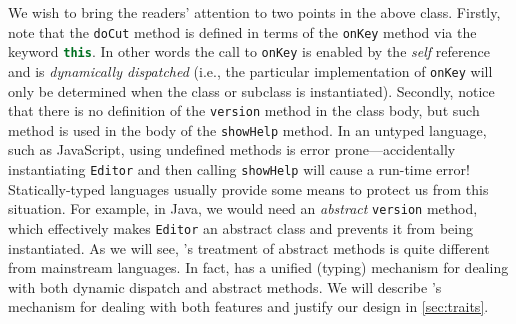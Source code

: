 We wish to bring the readers' attention to two points in the above class.
Firstly, note that the \lstinline{doCut} method is defined in terms of the
\lstinline{onKey} method via the keyword
\lstinline[language=JavaScript]{this}. In other words the call to
\lstinline{onKey} is enabled by the \emph{self} reference and is
\emph{dynamically dispatched} (i.e., the particular implementation of
\lstinline{onKey} will only be determined when the class or subclass
is instantiated). %
Secondly, notice that there is no definition of
the \lstinline{version} method in the class body, but such method is used in the body of the
\lstinline{showHelp} method. In an untyped language, such as JavaScript, using
undefined methods is error prone---accidentally instantiating \lstinline{Editor}
and then calling \lstinline{showHelp} will cause a run-time error!
Statically-typed languages usually provide some means to protect us from this
situation. For example, in Java, we would need an \textit{abstract} \lstinline{version}
method, which effectively makes \lstinline{Editor} an abstract class and
prevents it from being instantiated. As we will see, \sedel's treatment of
abstract methods is quite different from mainstream languages. In fact, \sedel
has a unified (typing) mechanism for dealing with both dynamic dispatch and abstract
methods. We will describe \sedel's mechanism for dealing with both features and
justify our design in \cref{sec:traits}.


